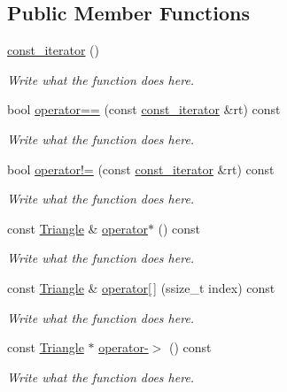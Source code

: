 \subsection*{Public Member Functions}
\begin{DoxyCompactItemize}
\item 
\hyperlink{classconst__iterator_a739991e4f2a7c6f93fcc8cc01e87dfc1}{const\+\_\+iterator} ()
\begin{DoxyCompactList}\small\item\em Write what the function does here. \end{DoxyCompactList}\item 
bool \hyperlink{classconst__iterator_a3ecf48cedf93f9dc93c4f999adfc3311}{operator==} (const \hyperlink{classconst__iterator}{const\+\_\+iterator} \&rt) const 
\begin{DoxyCompactList}\small\item\em Write what the function does here. \end{DoxyCompactList}\item 
bool \hyperlink{classconst__iterator_a4368c17596f9228b769f06b2a8e7ae7e}{operator!=} (const \hyperlink{classconst__iterator}{const\+\_\+iterator} \&rt) const 
\begin{DoxyCompactList}\small\item\em Write what the function does here. \end{DoxyCompactList}\item 
const \hyperlink{structTriangle}{Triangle} \& \hyperlink{classconst__iterator_a44a2e511da160e597a0e08cf5943e496}{operator$\ast$} () const 
\begin{DoxyCompactList}\small\item\em Write what the function does here. \end{DoxyCompactList}\item 
const \hyperlink{structTriangle}{Triangle} \& \hyperlink{classconst__iterator_a140f62b158e201123147983c18e73064}{operator\mbox{[}$\,$\mbox{]}} (ssize\+\_\+t index) const 
\begin{DoxyCompactList}\small\item\em Write what the function does here. \end{DoxyCompactList}\item 
const \hyperlink{structTriangle}{Triangle} $\ast$ \hyperlink{classconst__iterator_ae54984b3bee5b2eaab85929bf534ac26}{operator-\/$>$} () const 
\begin{DoxyCompactList}\small\item\em Write what the function does here. \end{DoxyCompactList}\item 

\end{DoxyCompactItemize}
